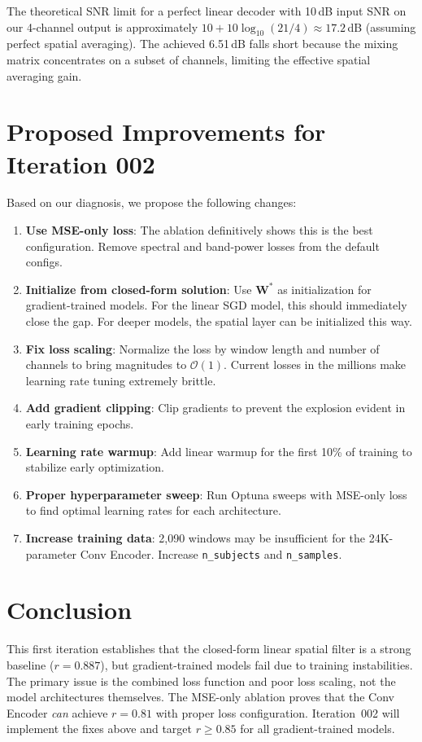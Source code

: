 \documentclass[11pt,a4paper]{article}
\begin{document}
The theoretical SNR limit for a perfect linear decoder with 10\,dB input SNR
on our 4-channel output is approximately $10 + 10\log_{10}(21/4) \approx 17.2$\,dB
(assuming perfect spatial averaging). The achieved 6.51\,dB falls short because
the mixing matrix concentrates on a subset of channels, limiting the effective
spatial averaging gain.

\section{Proposed Improvements for Iteration 002}

Based on our diagnosis, we propose the following changes:

\begin{enumerate}
  \item \textbf{Use MSE-only loss}: The ablation definitively shows this is
    the best configuration. Remove spectral and band-power losses from the
    default configs.

  \item \textbf{Initialize from closed-form solution}: Use $\mathbf{W}^*$ as
    initialization for gradient-trained models. For the linear SGD model, this
    should immediately close the gap. For deeper models, the spatial layer can
    be initialized this way.

  \item \textbf{Fix loss scaling}: Normalize the loss by window length and
    number of channels to bring magnitudes to $\mathcal{O}(1)$. Current losses
    in the millions make learning rate tuning extremely brittle.

  \item \textbf{Add gradient clipping}: Clip gradients to prevent the explosion
    evident in early training epochs.

  \item \textbf{Learning rate warmup}: Add linear warmup for the first 10\%
    of training to stabilize early optimization.

  \item \textbf{Proper hyperparameter sweep}: Run Optuna sweeps with MSE-only
    loss to find optimal learning rates for each architecture.

  \item \textbf{Increase training data}: 2,090 windows may be insufficient
    for the 24K-parameter Conv Encoder. Increase \texttt{n\_subjects} and
    \texttt{n\_samples}.
\end{enumerate}

\section{Conclusion}

This first iteration establishes that the closed-form linear spatial filter
is a strong baseline ($r=0.887$), but gradient-trained models fail due to
training instabilities. The primary issue is the combined loss function and
poor loss scaling, not the model architectures themselves. The MSE-only ablation
proves that the Conv Encoder \emph{can} achieve $r=0.81$ with proper loss
configuration. Iteration~002 will implement the fixes above and target
$r \geq 0.85$ for all gradient-trained models.
\end{document}
